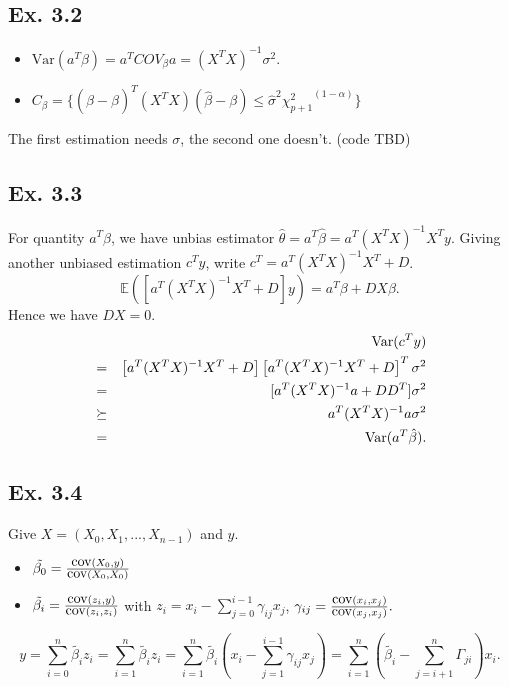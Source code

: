 \subsection*{Ex. 3.2}

\begin{itemize}
    \item $\mbox{Var}(a^{T}\beta) = a^{T}COV_\beta a = (X^{T}X)^{-1}\sigma^2$.
    \item $C_{\beta}=\{(\hat{\beta} - \beta)^T(X^TX)(\hat{\beta} - \beta)\leq \hat{\sigma}^2 {\chi_{p+1}^2}^{(1-\alpha)}\}$
\end{itemize}

The first estimation needs $\sigma$, the second one doesn't. (code TBD)

\subsection*{Ex. 3.3}
For quantity $a^{T}\beta$, we have unbias estimator $\hat{\theta} = a^T\hat{\beta} = a^T (X^{T}X)^{-1}X^{T}y.$ Giving another unbiased estimation $c^{T}y$, write $c^{T} = a^{T}(X^{T}X)^{-1}X^{T} + D$.
$$\mathbb{E}(\left[a^{T}(X^{T}X)^{-1}X^{T} + D\right]y)=a^{T}\beta + DX\beta.$$
Hence we have $DX = 0$.
\begin{eqnarray*}
    & & \operatorname*{\mbox{Var}}(c^{T}y) \\
    &=& \left[a^{T}(X^{T}X)^{-1}X^{T} + D\right]\left[a^{T}(X^{T}X)^{-1}X^{T} + D\right]^T \sigma^2\\
    &=& [a^{T}(X^{T}X)^{-1}a + DD^T]\sigma^2 \\
    &\succeq& a^{T}(X^{T}X)^{-1}a\sigma^2 \\
    &=& \operatorname*{\mbox{Var}}(a^T\hat{\beta}).
\end{eqnarray*}

\subsection*{Ex. 3.4}
Give $X = (X_0, X_1, ..., X_{n - 1})$ and $y$.
\begin{itemize}
    \item $\tilde{\beta_0} = \frac{\operatorname*{\mbox{cov}}(X_0, y)}{\operatorname*{\mbox{cov}}(X_0, X_0)}$
    \item $\tilde{\beta_i} = \frac{\operatorname*{\mbox{cov}}(z_i, y)}{\operatorname*{\mbox{cov}}(z_i, z_i)}$ with $z_i = x_i - \sum_{j=0}^{i-1} \gamma_{ij} x_j$, $\gamma_{ij} = \frac{\operatorname*{\mbox{cov}}(x_i, x_j)}{\operatorname*{\mbox{cov}}(x_j, x_j)}.$
\end{itemize}
$$y = \sum_{i=0}^{n}\tilde{\beta_i}z_{i} = \sum_{i=1}^{n}\tilde{\beta_i}z_{i}= \sum_{i=1}^{n}\tilde{\beta_i}(x_i - \sum_{j=1}^{i-1} \gamma_{ij} x_j)= \sum_{i=1}^{n}(\tilde{\beta_i}-\sum_{j=i+1}^{n}\Gamma_{ji})x_i.$$

